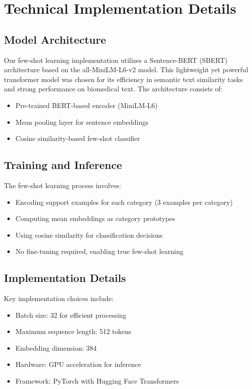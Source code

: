 \documentclass[12pt,a4paper]{article}
\begin{document}
\section{Technical Implementation Details}
\subsection{Model Architecture}
Our few-shot learning implementation utilizes a Sentence-BERT (SBERT) architecture based on the all-MiniLM-L6-v2 model. This lightweight yet powerful transformer model was chosen for its efficiency in semantic text similarity tasks and strong performance on biomedical text. The architecture consists of:

\begin{itemize}
    \item Pre-trained BERT-based encoder (MiniLM-L6)
    \item Mean pooling layer for sentence embeddings
    \item Cosine similarity-based few-shot classifier
\end{itemize}

\subsection{Training and Inference}
The few-shot learning process involves:
\begin{itemize}
    \item Encoding support examples for each category (3 examples per category)
    \item Computing mean embeddings as category prototypes
    \item Using cosine similarity for classification decisions
    \item No fine-tuning required, enabling true few-shot learning
\end{itemize}

\subsection{Implementation Details}
Key implementation choices include:
\begin{itemize}
    \item Batch size: 32 for efficient processing
    \item Maximum sequence length: 512 tokens
    \item Embedding dimension: 384
    \item Hardware: GPU acceleration for inference
    \item Framework: PyTorch with Hugging Face Transformers
\end{itemize}
\end{document}

